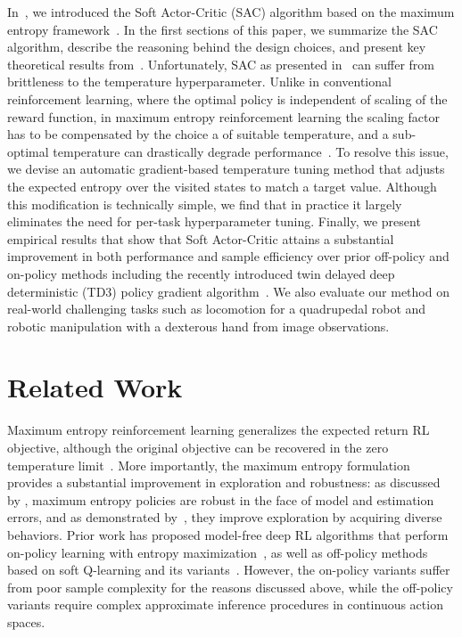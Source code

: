 In~\citep{haarnoja2018soft}, we introduced the Soft Actor-Critic (SAC) algorithm based on the maximum entropy framework~\citep{ziebart2008maximum,toussaint2009robot,rawlik2012stochastic,fox2015taming,haarnoja2017reinforcement}. In the first sections of this paper, we summarize the SAC algorithm, describe the reasoning behind the design choices, and present key theoretical results from~\citep{haarnoja2018soft}. Unfortunately, SAC as presented in~\citep{haarnoja2018soft} can suffer from brittleness to the temperature hyperparameter. Unlike in conventional reinforcement learning, where the optimal policy is independent of scaling of the reward function, in maximum entropy reinforcement learning the scaling factor has to be compensated by the choice a of suitable temperature, and a sub-optimal temperature can drastically degrade performance~\cite{haarnoja2018soft}. To resolve this issue, we devise an  automatic gradient-based temperature tuning method that adjusts the expected entropy over the visited states to match a target value. Although this modification is technically simple, we find that in practice it largely eliminates the need for per-task hyperparameter tuning. %
Finally, we present empirical results that show that Soft Actor-Critic attains a substantial improvement in both performance and sample efficiency over prior off-policy and on-policy methods including the recently introduced twin delayed deep deterministic (TD3) policy gradient algorithm~\citep{fujimoto2018addressing}. We also evaluate our method on real-world challenging tasks such as locomotion for a quadrupedal robot and robotic manipulation with a dexterous hand from image observations.
%

%
%
%

%


\section{Related Work}
Maximum entropy reinforcement learning generalizes the expected return RL objective, although the original objective can be recovered in the zero temperature limit~\citep{haarnoja2017reinforcement}.
More importantly, the maximum entropy formulation provides a substantial improvement in exploration and robustness: as discussed by \citet{ziebart2010modeling}, maximum entropy policies are robust in the face of model and estimation errors, and as demonstrated by~\cite{haarnoja2017reinforcement}, they improve exploration by acquiring diverse behaviors. Prior work has proposed model-free deep RL algorithms that perform on-policy learning with entropy maximization~\citep{o2016pgq}, as well as off-policy methods based on soft Q-learning and its variants~\citep{schulman2017equivalence, nachum2017bridging, haarnoja2017reinforcement}. However, the on-policy variants suffer from poor sample complexity for the reasons discussed above, while the off-policy variants require complex approximate inference procedures in continuous action spaces.

